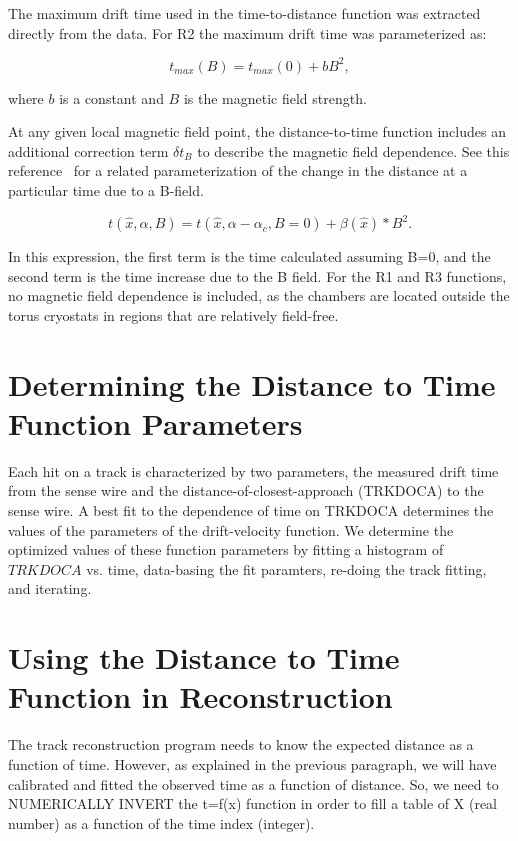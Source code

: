 The maximum drift time used in the time-to-distance function was extracted 
directly from the data.  For R2 the maximum drift time was parameterized as:

\begin{equation} 
\label{eq-bmax}
t_{max}(B) = t_{max}(0) + b B^2,
\end{equation}

\noindent
where $b$ is a constant and $B$ is the magnetic field strength.

At any given local magnetic field point, the distance-to-time function 
includes an additional correction term $\delta t_B$ to describe 
the magnetic field dependence.  See this reference~\cite{qin96} for a related
parameterization of the change in the distance at a particular time due to a
B-field. 

\begin{equation}
\label{XTB}
t(\hat{x},\alpha,B) = t(\hat{x},\alpha-\alpha_c, B=0) +  \beta(\hat{x})*B^2.
\end{equation}

\noindent
In this expression, the first term is the time calculated assuming B=0, and the
second term is the time increase due to the B field.  For the R1 and R3 functions, no magnetic field 
dependence is included, as the chambers are located outside the torus 
cryostats in regions that are relatively field-free.

\section{Determining the Distance to Time Function Parameters}
Each hit on a track is characterized by two parameters, the measured drift 
time from the sense wire and the distance-of-closest-approach (TRKDOCA) to the 
sense wire.  A best fit to the dependence of time on TRKDOCA determines the
values of the parameters of the drift-velocity function. 
We determine the optimized values of these function parameters by fitting
a histogram of $TRKDOCA$ vs. time, data-basing the fit paramters, re-doing
the track fitting, and iterating.


\section{Using the Distance to Time Function in Reconstruction}
The track reconstruction program needs to know the expected distance as a function
of time.  However, as explained in the previous paragraph, we will have calibrated and fitted
the observed time as a function of distance.  So, we need to NUMERICALLY INVERT the t=f(x)
function in order to fill a table of X (real number) as a function of the time index (integer).

